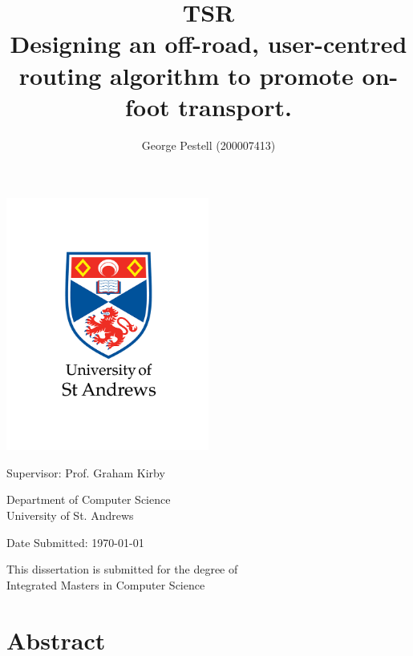 \documentclass[12pt]{article}
\title{{\huge TSR}\vspace{0.5em}\\
Designing an off-road, user-centred routing algorithm to promote on-foot transport.}
\author{George Pestell (200007413)}
\date{}
\begin{document}
\fancyhead[R]{\thepage}
\fancyfoot{}

\makeatletter
\begin{titlepage}
  \centering

  \vspace*{\fill}

  \textbf{\large{\thetitle}}

  \includegraphics[width=0.5\textwidth]{./assets/01-standard-vertical-black-text.png}

  \textbf{\large{\theauthor}}

  \vspace{0.2cm}

  \large{Supervisor: Prof. Graham Kirby}
  \vspace{0.8cm}

  \large{Department of Computer Science\\
    University of St. Andrews}

  \large{Date Submitted: \today}

  \vspace{0.8cm}

  \large{This dissertation is submitted for the degree of \\
    Integrated Masters in Computer Science}


  \vspace*{\fill}

\end{titlepage}
\makeatother

\pagebreak
{}

\section*{Abstract}
\end{document}
